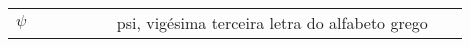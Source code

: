 

\begin{listasimb}

\begin{longtable}[l]{p{0.2\linewidth}p{0.7\linewidth}}
$\psi$ & psi, vigésima terceira letra do alfabeto grego\\
\end{longtable}

\end{listasimb}

